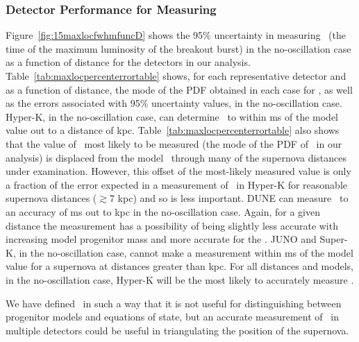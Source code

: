 \subsubsection{Detector Performance for Measuring \tmax}
Figure~\ref{fig:15maxlocfwhmfuncD} shows the  95\% uncertainty in
measuring \tmax\ (the time of the maximum luminosity of the breakout
burst) in the no-oscillation case as a function of 
distance for the detectors in our
analysis.  
Table~\ref{tab:maxlocpercenterrortable} shows, for each representative
detector and as a function of distance, the mode of the PDF obtained
in each case for \tmax, as well as the 
errors associated with 95\% uncertainty values, in the no-oscillation case.
Hyper-K, in the no-oscillation case,  can
determine \tmax\ to within  ms of the model value out to a
distance of  kpc.  
Table~\ref{tab:maxlocpercenterrortable} also shows that the value of
\tmax\ most likely to be measured (the mode of the PDF of \tmax\ in our
analysis) is displaced from the model \tmax\  through many of the 
supernova distances under examination.  
However, this offset of the most-likely measured value is
only a fraction of the error expected in a measurement of \tmax\ in
Hyper-K for reasonable supernova distances ($\gtrsim$7 kpc) 
and so is less important.  
DUNE can measure \tmax\ to an 
accuracy of  ms out to  kpc in the no-oscillation case.  
Again, for a
given distance the measurement has a possibility of being 
slightly less accurate with
increasing model progenitor mass and more accurate for the \shen.  
JUNO and Super-K, in the no-oscillation case,  
cannot make a measurement within  ms of the
model value for a supernova at distances greater 
than  kpc.  For all distances and
models, in the no-oscillation case, 
Hyper-K will be the most likely to accurately measure \tmax.

We have defined
\tmax\ in such a way that it is not useful for distinguishing between
progenitor models and equations of state, but an accurate measurement
of \tmax\ in multiple detectors could be useful in
triangulating the position of the supernova.  

